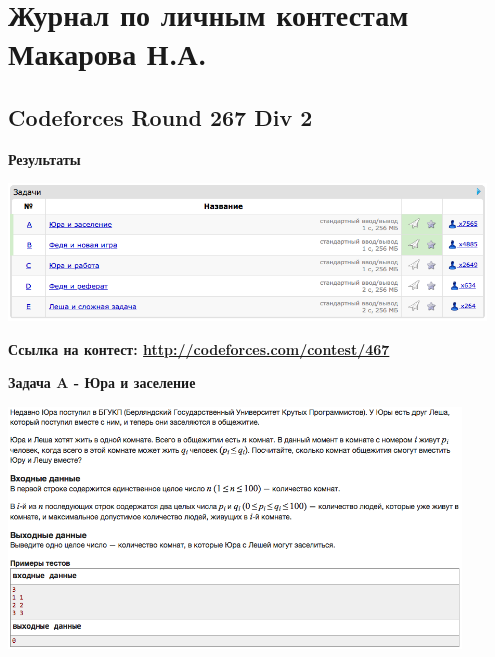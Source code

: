 \documentclass[a4paper,12pt]{article}
\begin{document}
%
%

\newpage
\section{Журнал по личным контестам Макарова Н.А.}

%
%

\subsection{Codeforces Round 267 Div 2}

\textbf{{\large Результаты}} \\
\begin{center}
\includegraphics[width=0.95\textwidth]{C_267/C_267_result.png}\\ [1cm]
\end{center}

\textbf{{\large Ссылка на контест: \url{http://codeforces.com/contest/467}}}

\newpage
\textbf{{\large Задача A - Юра и заселение}}

\begin{center}
\includegraphics[width=0.9\textwidth]{C_267/C_267_A.png}\\ [1cm]
\end{center}
\end{document}
